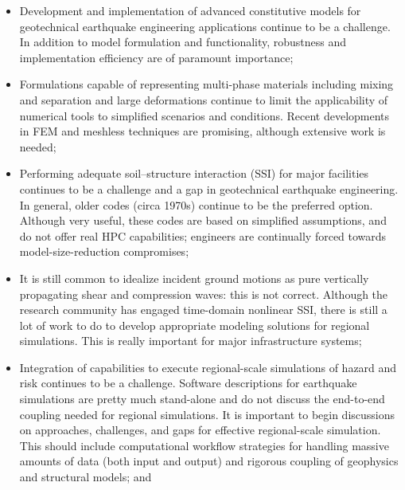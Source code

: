 \begin{itemize}

\item Development and implementation of advanced constitutive models for geotechnical earthquake engineering applications continue to be a challenge. In addition to model formulation and functionality, robustness and implementation efficiency are of paramount importance;  
\vspace{2mm}
\item Formulations capable of representing multi-phase materials including mixing and separation and large deformations continue to limit the applicability of numerical tools to simplified scenarios and conditions. Recent developments in FEM and meshless techniques are promising, although extensive work is needed;

\vspace{2mm}

\item Performing adequate soil--structure interaction (SSI) for major facilities continues to be a challenge and a gap in geotechnical earthquake engineering. In general, older codes (circa 1970s) continue to be the preferred option. Although very useful, these codes are based on simplified assumptions, and do not offer real HPC capabilities; engineers are continually forced towards model-size-reduction compromises;

\vspace{2mm}

\item It is still common to idealize incident ground motions as pure vertically propagating shear and compression waves: this is not correct. Although the research community has engaged time-domain nonlinear SSI, there is still a lot of work to do to develop appropriate modeling solutions for regional simulations. This is really important for major infrastructure systems;

\vspace{2mm}

\item Integration of capabilities to execute regional-scale simulations of hazard and risk continues to be a challenge. Software descriptions for earthquake simulations are pretty much stand-alone and do not discuss the end-to-end coupling needed for regional simulations. It is important to begin discussions on approaches, challenges, and gaps for effective regional-scale simulation. This should include computational workflow strategies for handling massive amounts of data (both input and output) and rigorous coupling of geophysics and structural models; and


\end{itemize}
